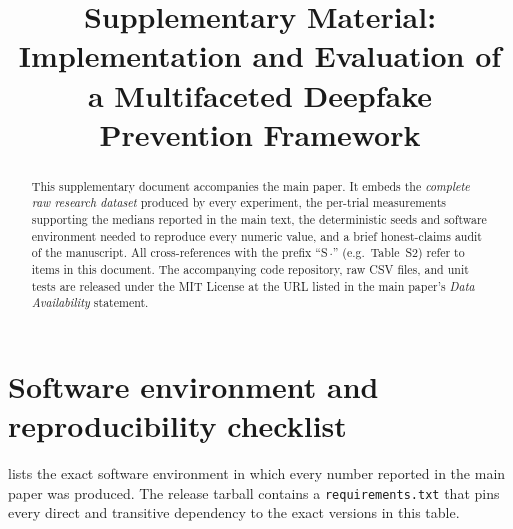 \documentclass[11pt,a4paper]{article}
\title{\bfseries Supplementary Material:\\[2pt]
\large Implementation and Evaluation of a Multifaceted
Deepfake Prevention Framework}
\begin{document}
\maketitle
\vspace{-2.5em}

\begin{abstract}\noindent
This supplementary document accompanies the main paper. It embeds the
\emph{complete raw research dataset} produced by every experiment, the
per-trial measurements supporting the medians reported in the main
text, the deterministic seeds and software environment needed to
reproduce every numeric value, and a brief honest-claims audit of the
manuscript. All cross-references with the prefix ``S\,$\cdot$'' (e.g.\
Table~S2) refer to items in this document. The accompanying code
repository, raw CSV files, and unit tests are released under the MIT
License at the URL listed in the main paper's \emph{Data
Availability} statement.
\end{abstract}

\tableofcontents
\vspace{1em}

\section{Software environment and reproducibility checklist}
\label{sec:supp-env}

 lists the exact software environment in which every
number reported in the main paper was produced. The release tarball
contains a \texttt{requirements.txt} that pins every direct and
transitive dependency to the exact versions in this table.
\end{document}
